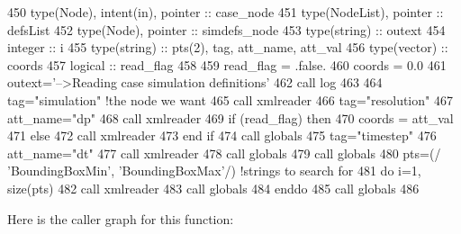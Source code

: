 \begin{DoxyCode}
450     \textcolor{keywordtype}{type}(Node), \textcolor{keywordtype}{intent(in)}, \textcolor{keywordtype}{pointer} :: case\_node
451     \textcolor{keywordtype}{type}(NodeList), \textcolor{keywordtype}{pointer} :: defsList
452     \textcolor{keywordtype}{type}(Node), \textcolor{keywordtype}{pointer} :: simdefs\_node
453     \textcolor{keywordtype}{type}(string) :: outext
454     \textcolor{keywordtype}{integer} :: i
455     \textcolor{keywordtype}{type}(string) :: pts(2), tag, att\_name, att\_val
456     \textcolor{keywordtype}{type}(vector) :: coords
457     \textcolor{keywordtype}{logical} :: read\_flag
458 
459     read\_flag = .false.
460     coords = 0.0
461     outext=\textcolor{stringliteral}{'-->Reading case simulation definitions'}
462     \textcolor{keyword}{call }log%
463 
464     tag=\textcolor{stringliteral}{"simulation"}    \textcolor{comment}{!the node we want}
465     \textcolor{keyword}{call }xmlreader%
466     tag=\textcolor{stringliteral}{"resolution"}
467     att\_name=\textcolor{stringliteral}{"dp"}
468     \textcolor{keyword}{call }xmlreader%
469     \textcolor{keywordflow}{if} (read\_flag) \textcolor{keywordflow}{then}
470         coords = att\_val%
471     \textcolor{keywordflow}{else}
472         \textcolor{keyword}{call }xmlreader%
473 \textcolor{keywordflow}{    end if}
474     \textcolor{keyword}{call }globals%
475     tag=\textcolor{stringliteral}{"timestep"}
476     att\_name=\textcolor{stringliteral}{"dt"}
477     \textcolor{keyword}{call }xmlreader%
478     \textcolor{keyword}{call }globals%
479     \textcolor{keyword}{call }globals%
480     pts=(/ \textcolor{stringliteral}{'BoundingBoxMin'}, \textcolor{stringliteral}{'BoundingBoxMax'}/) \textcolor{comment}{!strings to search for}
481     \textcolor{keywordflow}{do} i=1, \textcolor{keyword}{size}(pts)
482         \textcolor{keyword}{call }xmlreader%
483         \textcolor{keyword}{call }globals%
484 \textcolor{keywordflow}{    enddo}
485     \textcolor{keyword}{call }globals%
486 
\end{DoxyCode}
Here is the caller graph for this function\+:\nopagebreak
